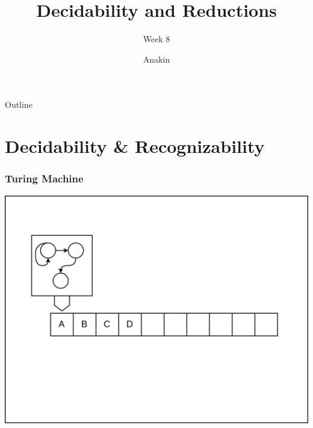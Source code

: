 \documentclass[aspectratio=169]{beamer}
\title{Decidability and Reductions}
\subtitle{Week 8}
\author{Anakin}
\date{}
\begin{document}

\begin{frame}
\titlepage
\end{frame}

\begin{frame}{Outline}
  \tableofcontents
\end{frame}

\section{Decidability \& Recognizability}
\frame{\sectionpage}


\begin{frame}
  \frametitle{Turing Machine}
  \begin{center}
    \includegraphics[width=.75\textwidth]{frame1.png}
  \end{center}
\end{frame}
\end{document}
